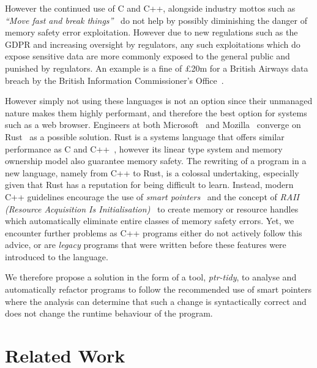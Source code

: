 \documentclass{mpaper}
\begin{document}
    However the continued use of C and C++, alongside industry mottos such as \emph{``Move fast and break things''}~\cite{Vardi2018} do not help by possibly diminishing the danger of memory safety error exploitation.
    However due to new regulations such as the GDPR and increasing oversight by regulators, any such exploitations which do expose sensitive data are more commonly exposed to the general public and punished by regulators.
    An example is a fine of £20m for a British Airways data breach by the British Information Commissioner's Office~\cite{ICO2020}. 

    However simply not using these languages is not an option since their unmanaged nature makes them highly performant, and therefore the best option for systems such as a web browser.
    Engineers at both Microsoft~\cite{Thomas2019} and Mozilla~\cite{Hostfelt2019} converge on Rust~\cite{Balasubramanian2017} as a possible solution.
    Rust is a systems language that offers similar performance as C and C++~\cite{Lin2016}, however its linear type system and memory ownership model also guarantee memory safety.
    The rewriting of a program in a new language, namely from C++ to Rust, is a colossal undertaking, especially given that Rust has a reputation for being difficult to learn.
    Instead, modern C++ guidelines encourage the use of \emph{smart pointers}~\cite{Dimov2003} and the concept of \emph{RAII (Resource Acquisition Is Initialisation)}~\cite{Stroustrup2000} to create memory or resource handles which automatically eliminate entire classes of memory safety errors.
    Yet, we encounter further problems as C++ programs either do not actively follow this advice, or are \emph{legacy} programs that were written before these features were introduced to the language.
    
    We therefore propose a solution in the form of a tool, \emph{ptr-tidy}, to analyse and automatically refactor programs to follow the recommended use of smart pointers where the analysis can determine that such a change is syntactically correct and does not change the runtime behaviour of the program. 



    \section{Related Work}\label{sec:related-work}
\end{document}
